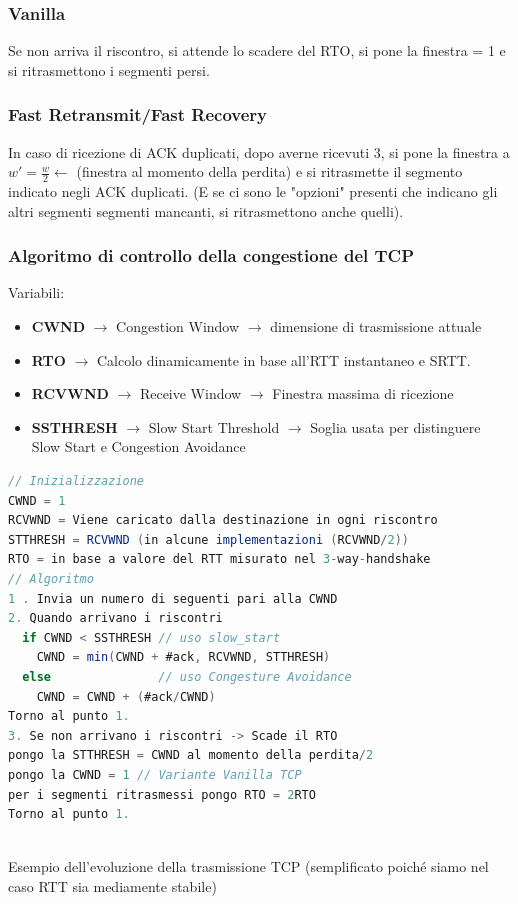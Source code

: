 \documentclass[a4paper]{article}
\begin{document}
\subsubsection{Vanilla}

Se non arriva il riscontro, si attende lo scadere del RTO, si pone la finestra = 1 e si ritrasmettono i segmenti persi.

\subsubsection{Fast Retransmit/Fast Recovery}

In caso di ricezione di ACK duplicati, dopo averne ricevuti 3, si pone la finestra a $w' = \frac{w}{2} \leftarrow$ (finestra al momento della perdita) e
si ritrasmette il segmento indicato negli ACK duplicati. (E se ci sono le "opzioni" presenti che indicano gli altri segmenti
segmenti mancanti, si ritrasmettono anche quelli).

\subsubsection{Algoritmo di controllo della congestione del TCP}

Variabili: 
\begin{itemize}
  \item \textbf{CWND} $\rightarrow$ Congestion Window $\rightarrow$ dimensione di trasmissione attuale 
  \item \textbf{RTO} $\rightarrow$ Calcolo dinamicamente in base all'RTT instantaneo e SRTT.
  \item \textbf{RCVWND} $\rightarrow$ Receive Window $\rightarrow$ Finestra massima di ricezione 
  \item \textbf{SSTHRESH} $\rightarrow$ Slow Start Threshold $\rightarrow$ Soglia usata per distinguere Slow Start e Congestion Avoidance 
\end{itemize}

\begin{lstlisting}[language=Scala]
// Inizializzazione
CWND = 1
RCVWND = Viene caricato dalla destinazione in ogni riscontro
STTHRESH = RCVWND (in alcune implementazioni (RCVWND/2))
RTO = in base a valore del RTT misurato nel 3-way-handshake
// Algoritmo
1 . Invia un numero di seguenti pari alla CWND
2. Quando arrivano i riscontri
  if CWND < SSTHRESH // uso slow_start
    CWND = min(CWND + #ack, RCVWND, STTHRESH)
  else               // uso Congesture Avoidance
    CWND = CWND + (#ack/CWND)
Torno al punto 1. 
3. Se non arrivano i riscontri -> Scade il RTO
pongo la STTHRESH = CWND al momento della perdita/2 
pongo la CWND = 1 // Variante Vanilla TCP
per i segmenti ritrasmessi pongo RTO = 2RTO
Torno al punto 1. 
    
\end{lstlisting}
Esempio dell'evoluzione della trasmissione TCP (semplificato poiché siamo nel caso RTT sia mediamente stabile)
\end{document}
